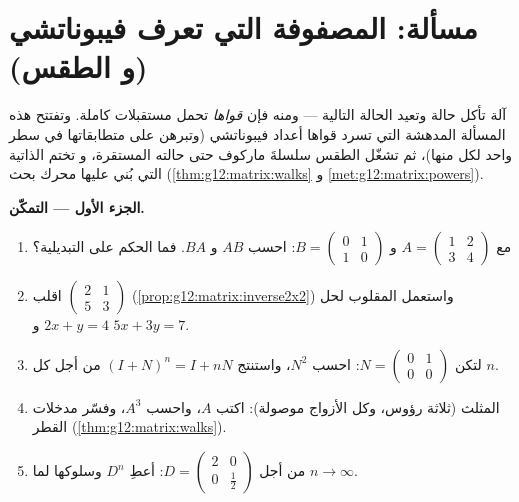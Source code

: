 \section{مسألة: المصفوفة التي تعرف فيبوناتشي (و
الطقس)}

\begin{problem}
\label{pb:g12:matrix:1}
 آلة تأكل حالة وتعيد الحالة التالية
--- ومنه فإن \emph{قواها} تحمل مستقبلات كاملة. وتفتتح هذه
المسألة  المدهشة التي تسرد قواها
أعداد فيبوناتشي (وتبرهن على متطابقاتها في سطر واحد لكل منها)،
ثم تشغّل الطقس سلسلةَ ماركوف حتى حالته المستقرة، و
تختم  الذاتية التي بُني عليها محرك بحث
(\cref{thm:g12:matrix:walks} و
\cref{met:g12:matrix:powers}).

\medskip
\noindent\textbf{الجزء الأول --- التمكّن.}
\begin{enumerate}
  \item مع $A = \begin{pmatrix} 1 & 2\\ 3 & 4\end{pmatrix}$
        و $B = \begin{pmatrix} 0 & 1\\ 1 & 0\end{pmatrix}$:
        احسب $AB$ و $BA$. فما الحكم على التبديلية؟
  \item اقلب $\begin{pmatrix} 2 & 1\\ 5 & 3\end{pmatrix}$
        (\cref{prop:g12:matrix:inverse2x2}) واستعمل المقلوب
        لحل $2x + y = 4$ و $5x + 3y = 7$.
  \item لتكن $N = \begin{pmatrix} 0 & 1\\ 0 & 0\end{pmatrix}$:
        احسب $N^2$، واستنتج
        $(I + N)^n = I + nN$ من أجل كل $n$.
  \item {} المثلث (ثلاثة رؤوس، وكل الأزواج موصولة):
        اكتب  $A$، واحسب $A^3$، وفسّر
        مدخلات القطر
        (\cref{thm:g12:matrix:walks}).
  \item من أجل $D = \begin{pmatrix} 2 & 0\\ 0 & \frac12
        \end{pmatrix}$: أعطِ $D^n$ وسلوكها لما
        $n \to \infty$.
\end{enumerate}


\end{problem}
